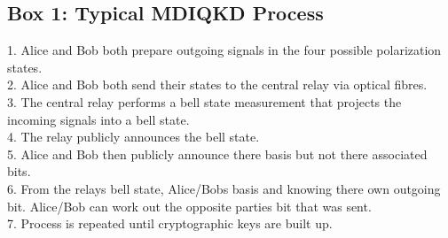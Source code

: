\documentclass[journal]{vgtc}
\begin{document}
\begin{tcolorbox}
\section{Box 1: Typical MDIQKD Process}

1. Alice and Bob both prepare outgoing signals in the four possible polarization states.\\
2. Alice and Bob both send their states to the central relay via optical fibres.\\
3. The central relay performs a bell state measurement that projects the incoming signals into a bell state.\\
4. The relay publicly announces the bell state.\\
5. Alice and Bob then publicly announce there basis but not there associated bits.\\
6. From the relays bell state, Alice/Bobs basis and knowing there own outgoing bit. Alice/Bob can work out the opposite parties bit that was sent.\\
7. Process is repeated until cryptographic keys are built up.

\end{tcolorbox}
\end{document}
